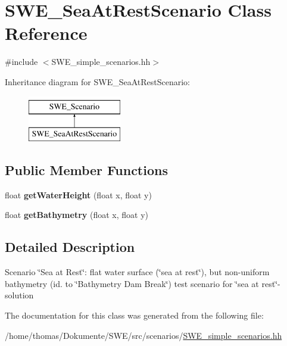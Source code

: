 \hypertarget{classSWE__SeaAtRestScenario}{\section{S\-W\-E\-\_\-\-Sea\-At\-Rest\-Scenario Class Reference}
\label{classSWE__SeaAtRestScenario}
}


{\ttfamily \#include $<$S\-W\-E\-\_\-simple\-\_\-scenarios.\-hh$>$}

Inheritance diagram for S\-W\-E\-\_\-\-Sea\-At\-Rest\-Scenario\-:\begin{figure}[H]
\begin{center}
\leavevmode
\includegraphics[height=2.000000cm]{classSWE__SeaAtRestScenario}
\end{center}
\end{figure}
\subsection*{Public Member Functions}
\begin{DoxyCompactItemize}
\item 
\hypertarget{classSWE__SeaAtRestScenario_a0d493a2c96cde62cc71035c5f62717d1}{float {\bfseries get\-Water\-Height} (float x, float y)}\label{classSWE__SeaAtRestScenario_a0d493a2c96cde62cc71035c5f62717d1}

\item 
\hypertarget{classSWE__SeaAtRestScenario_a738776f758bb5b914ede2e6f57cb3ffd}{float {\bfseries get\-Bathymetry} (float x, float y)}\label{classSWE__SeaAtRestScenario_a738776f758bb5b914ede2e6f57cb3ffd}

\end{DoxyCompactItemize}


\subsection{Detailed Description}
Scenario \char`\"{}\-Sea at Rest\char`\"{}\-: flat water surface (\char`\"{}sea at rest\char`\"{}), but non-\/uniform bathymetry (id. to \char`\"{}\-Bathymetry Dam Break\char`\"{}) test scenario for \char`\"{}sea at rest\char`\"{}-\/solution 

The documentation for this class was generated from the following file\-:\begin{DoxyCompactItemize}
\item 
/home/thomas/\-Dokumente/\-S\-W\-E/src/scenarios/\hyperlink{SWE__simple__scenarios_8hh}{S\-W\-E\-\_\-simple\-\_\-scenarios.\-hh}\end{DoxyCompactItemize}
